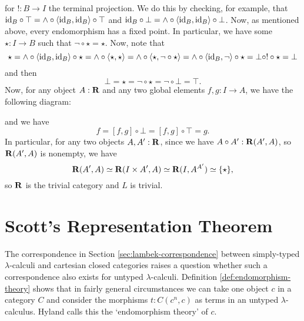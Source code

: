\begin{center}
\end{center}
for $ !: B \to I $ the terminal projection. We do this by checking, for example, that $ \text{id}_{B} \circ \top = \land \circ \langle \text{id}_{B}, \text{id}_{B} \rangle \circ \top $ and $ \text{id}_{B} \circ \bot = \land \circ \langle \text{id}_{B}, \text{id}_{B} \rangle \circ \bot $. Now, as mentioned above, every endomorphism has a fixed point. In particular, we have some $ \star: I \to B $ such that $ \lnot \circ \star = \star $. Now, note that
\[ \star = \land \circ \langle \text{id}_{B}, \text{id}_{B} \rangle \circ \star = \land \circ \langle \star, \star \rangle = \land \circ \langle \star, \lnot \circ \star \rangle = \land \circ \langle \text{id}_{B}, \lnot \rangle \circ \star = \bot \circ ! \circ \star = \bot \]
and then
\[ \bot = \star = \lnot \circ \star = \lnot \circ \bot = \top. \]
Now, for any object $ A: \mathbf{R} $ and any two global elements $ f, g: I \to A $, we have the following diagram:
\begin{center}
\end{center}
and we have
\[ f = [f, g] \circ \bot = [f, g] \circ \top = g. \]
In particular, for any two objects $ A, A^\prime: \mathbf{R} $, since we have $ A \circ A^\prime : \mathbf{R}(A^\prime, A) $, so $ \mathbf{R}(A^\prime, A) $ is nonempty, we have
\[ \mathbf{R}(A^\prime, A) \simeq \mathbf{R}(I \times A^\prime, A) \simeq \mathbf{R}(I, A^{A^\prime}) \simeq \{ \star \}, \]
so $ \mathbf{R} $ is the trivial category and $ L $ is trivial.

\section{Scott's Representation Theorem}
The correspondence in Section \ref{sec:lambek-correspondence} between simply-typed $ \lambda $-calculi and cartesian closed categories raises a question whether such a correspondence also exists for untyped $ \lambda $-calculi. Definition \ref{def:endomorphism-theory} shows that in fairly general circumstances we can take one object $ c $ in a category $ C $ and consider the morphisms $ t: C(c^n, c) $ as terms in an untyped $ \lambda $-calculus. Hyland calls this the `endomorphism theory' of $ c $.


